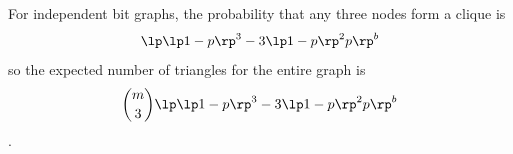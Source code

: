 \fi

\iffalse
For independent bit graphs, the probability that any three nodes form a clique is $$\lp \lp 1-p\rp ^3 - 3\lp 1-p\rp ^2p\rp ^b$$ so the expected number of triangles for the entire graph is $${{m}\choose{3}}\lp \lp 1-p\rp ^3 - 3\lp 1-p\rp ^2p\rp ^b$$.

